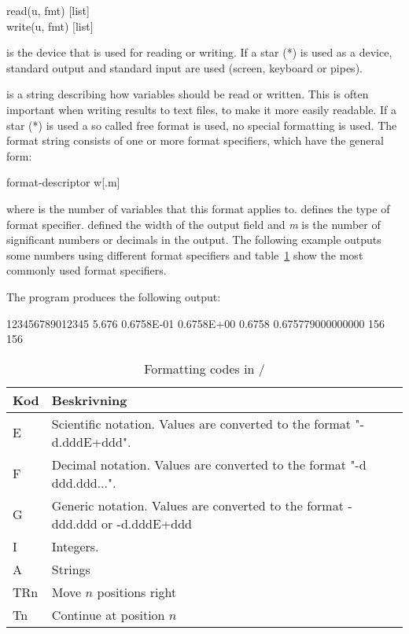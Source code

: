 \begin{fsyntax}
read(u, fmt) [list]\\
write(u, fmt) [list]
\end{fsyntax}

 is the device that is used for reading or writing. If a star (*) is used as a device, standard output and standard
input are used (screen, keyboard or pipes).

 is a string describing how variables should be read or written. This is often important when writing results to text files, to make it more easily readable. If a star (*) is used a so called free format is used, no special formatting is used. The format string consists of one or more format specifiers, which have the general form:

\begin{fsyntax}
 format-descriptor w[.m]
\end{fsyntax}

where  is the number of variables that this format applies to.  defines the type of format specifier.  defined the width of the output field and \textit{m} is the number of significant numbers or decimals in the output. The following example outputs some numbers using different format specifiers and table~\ref{table:formatkoder} show the most commonly used format specifiers.


The program produces the following output:

\begin{fortrancodeenv}
123456789012345
      5.676
     0.6758E-01
     0.6758E+00
         0.6758
  0.675779000000000
            156
         156
\end{fortrancodeenv}

\begin{table}
\begin{center}
\begin{tabular}{|l|l|}
\hline
Kod & Beskrivning \\
\hline
E   & Scientific notation. Values are converted to the format "-d.dddE+ddd". \\
F   & Decimal notation. Values are converted to the format "-d ddd.ddd...". \\
G   & Generic notation. Values are converted to the format -ddd.ddd or -d.dddE+ddd \\
I   & Integers. \\
A   & Strings \\
TRn & Move $n$ positions right \\
Tn  & Continue at position $n$ \\
\hline
\end{tabular}
\end{center}
\caption{Formatting codes in /}
\label{table:formatkoder}
\end{table}

